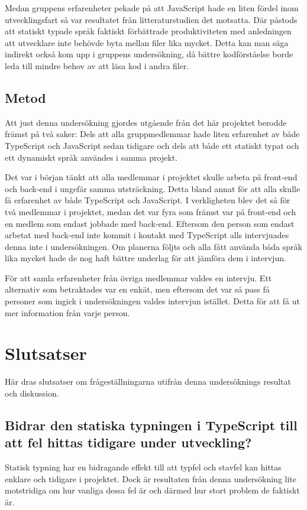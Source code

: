 Medan gruppens erfarenheter pekade på att JavaScript hade en liten fördel inom utvecklingsfart så var resultatet från litteraturstudien det motsatta. Där påstods att statiskt typade språk faktiskt förbättrade produktiviteten med anledningen att utvecklare inte behövde byta mellan filer lika mycket. \cite{henrik_maintainability} Detta kan man säga indirekt också kom upp i gruppens undersökning, då bättre kodförståelse borde leda till mindre behov av att läsa kod i andra filer.
\subsection{Metod}
Att just denna undersökning gjordes utgående från det här projektet berodde främst på två saker: Dels att alla gruppmedlemmar hade liten erfarenhet av både TypeScript och JavaScript sedan tidigare och dels att både ett statiskt typat och ett dynamiskt språk användes i samma projekt.

Det var i början tänkt att alla medlemmar i projektet skulle arbeta på front-end och back-end i ungefär samma utsträckning. Detta bland annat för att alla skulle få erfarenhet av både TypeScript och JavaScript. I verkligheten blev det så för två medlemmar i projektet, medan det var fyra som främst var på front-end och en medlem som endast jobbade med back-end. Eftersom den person som endast arbetat med back-end inte kommit i kontakt med TypeScript alls intervjuades denna inte i undersökningen. Om planerna följts och alla fått använda båda språk lika mycket hade de nog haft bättre underlag för att jämföra dem i intervjun.

För att samla erfarenheter från övriga medlemmar valdes en intervju. Ett alternativ som betraktades var en enkät, men eftersom det var så pass få personer som ingick i undersökningen valdes intervjun istället. Detta för att få ut mer information från varje person.

\section{Slutsatser}
Här dras slutsatser om frågeställningarna utifrån denna undersöknings resultat och diskussion.
\subsection{Bidrar den statiska typningen i TypeScript till att fel hittas tidigare under utveckling?}
Statisk typning har en bidragande effekt till att typfel och stavfel kan hittas enklare och tidigare i projektet. Dock är resultaten från denna undersökning lite motstridiga om hur vanliga dessa fel är och därmed hur stort problem de faktiskt är.

